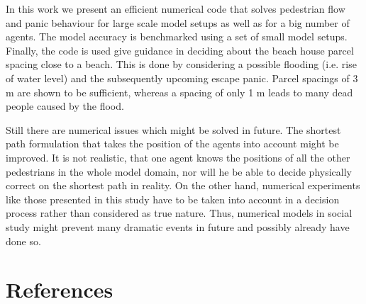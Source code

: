 \documentclass[11pt]{article}
\begin{document}
In this work we present an efficient numerical code that solves pedestrian flow and panic behaviour for large scale model setups as well as for a big number of agents. The model accuracy is benchmarked using a set of small model setups. Finally, the code is used give guidance in deciding about the beach house parcel spacing close to a beach. This is done by considering a possible flooding (i.e. rise of water level) and the subsequently upcoming escape panic. Parcel spacings of 3 m are shown to be sufficient, whereas a spacing of only 1 m leads to many dead people caused by the flood.

Still there are numerical issues which might be solved in future. The shortest path formulation that takes the position of the agents into account might be improved. It is not realistic, that one agent knows the positions of all the other pedestrians in the whole model domain, nor will he be able to decide physically correct on the shortest path in reality. On the other hand, numerical experiments like those presented in this study have to be taken into account in a decision process rather than considered as true nature. Thus, numerical models in social study might prevent many dramatic events in future and possibly already have done so.

\section{References}



\end{document}
